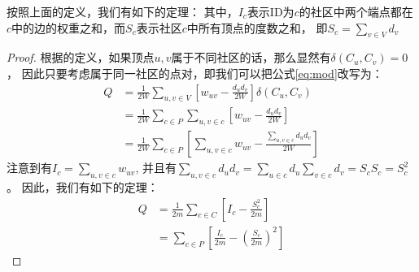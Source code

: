 \documentclass[master]{njuthesis}
\begin{document}
按照上面的定义，我们有如下的定理：
其中，$I_c$表示ID为$c$的社区中两个端点都在$c$中的边的权重之和，而$S_c$表示社区$c$中所有顶点的度数之和，
即$S_c = \sum_{v \in V} {d_v}$
\begin{proof}
根据\label{eq:modularity}的定义，如果顶点$u, v$属于不同社区的话，那么显然有$\delta(C_u, C_v)=0$，
因此只要考虑属于同一社区的点对，即我们可以把公式\ref{eq:mod}改写为：
\begin{equation}
\begin{aligned}
Q &= \frac{1}{2W}\sum\limits_{u, v \in V} \left[w_{uv} - \frac{{d_u}{d_v}}{2W} \right]\delta(C_u, C_v) \\
& = \frac{1}{2W}\sum\limits_{c \in P} {\sum\limits_{u, v \in c} { \left[w_{uv} - \frac{{d_u}{d_v}}{2W} \right]}} \\
& = \frac{1}{2W}\sum\limits_{c \in P} \left[{\sum\limits_{u, v \in c} { w_{uv} - \frac{\sum\nolimits_{u,v \in c}{{d_u}{d_v}}}{2W}}}\right] 
\end{aligned}
\end{equation}
注意到有$I_c=\sum\nolimits_{u, v \in c}  w_{uv}$, 
并且有$\sum\nolimits_{u,v \in c}{{d_u}{d_v}} =
\sum\nolimits_{u \in c}{d_u} \sum\nolimits_{v \in c}{d_v} = S_c S_c = {S^2_c}$。
因此，我们有如下的定理：
\begin{equation}
\begin{aligned}
Q &= \frac{1}{2m}\sum\limits_{c \in C} \left[I_c - \frac{S_c^2}{2m} \right] \\
& = \sum\limits_{c \in P} \left[\frac{I_c}{2m} - {\left(\frac{S_c}{2m}\right)}^2 \right]
\end{aligned}
\end{equation}
\end{proof}
\end{document}
